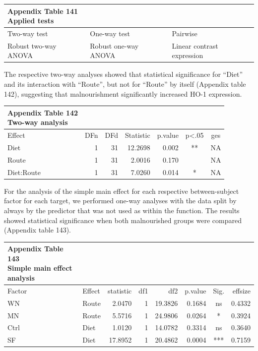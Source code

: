 \documentclass[
  12pt,
  letterpaper,
]{article}
\begin{document}
\begingroup
\fontsize{12.0pt}{14.4pt}\selectfont
\begin{longtable}{lll}
\caption*{
{\large \textbf{Appendix Table 141}} \\ 
{\small \textbf{Applied tests}}
} \\ 
\toprule
{Two-way test} & {One-way test} & {Pairwise} \\ 
\midrule\addlinespace[2.5pt]
Robust two-way ANOVA & Robust one-way ANOVA & Linear contrast expression \\ 
\bottomrule
\end{longtable}
\endgroup

The respective two-way analyses showed that statistical significance for ``Diet'' and its interaction with ``Route'', but not for ``Route'' by itself (Appendix table 142), suggesting that malnourishment significantly increased HO-1 expression.

\begingroup
\fontsize{12.0pt}{14.4pt}\selectfont
\begin{longtable}{lrrrrcc}
\caption*{
{\large \textbf{Appendix Table 142}} \\ 
{\small \textbf{Two-way analysis}}
} \\ 
\toprule
{Effect} & {DFn} & {DFd} & {Statistic} & {p.value} & {p<.05} & {ges} \\ 
\midrule\addlinespace[2.5pt]
Diet & 1 & 31 & 12.2698 & 0.002 & ** & NA \\ 
Route & 1 & 31 & 2.0016 & 0.170 &   & NA \\ 
Diet:Route & 1 & 31 & 7.0260 & 0.014 & * & NA \\ 
\bottomrule
\end{longtable}
\endgroup

For the analysis of the simple main effect for each respective between-subject factor for each target, we performed one-way analyses with the data split by always by the predictor that was not used as within the function. The results showed statistical significance when both malnourished groups were compared (Appendix table 143).

\begingroup
\fontsize{12.0pt}{14.4pt}\selectfont
\begin{longtable}{l|lrrrrcr}
\caption*{
{\large \textbf{Appendix Table 143}} \\ 
{\small \textbf{Simple main effect analysis}}
} \\ 
\toprule
Factor & {Effect} & {statistic} & {df1} & {df2} & {p.value} & {Sig.} & {effsize} \\ 
\midrule\addlinespace[2.5pt]
WN & Route & 2.0470 & 1 & 19.3826 & 0.1684 & ns & 0.4332 \\ 
MN & Route & 5.5716 & 1 & 24.9806 & 0.0264 & * & 0.3924 \\ 
Ctrl & Diet & 1.0120 & 1 & 14.0782 & 0.3314 & ns & 0.3640 \\ 
SF & Diet & 17.8952 & 1 & 20.4862 & 0.0004 & *** & 0.7159 \\ 
\bottomrule
\end{longtable}
\endgroup
\end{document}
